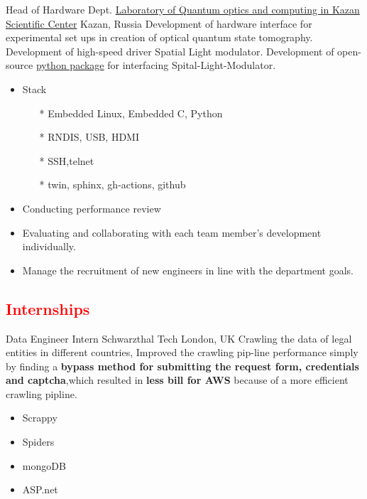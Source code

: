         {Head of Hardware Dept.}
        {\href{http://kfti.knc.ru/}{\color{blue}Laboratory of Quantum optics and  computing  in  Kazan Scientific Center}}
        {Kazan, Russia}
        {
        \newline
        Development of hardware interface for experimental set ups in creation of optical quantum state tomography. 
        Development of high-speed driver Spatial Light modulator.
        Development of open-source \href{https://pypi.org/project/holoeye-embedded/}{\color{blue}python package} for interfacing Spital-Light-Modulator.    
        } 
        {
        \begin{itemize}
            \item Stack
                \begin{itemize}
                \item[*] Embedded Linux, Embedded C, Python
                \item[*] RNDIS, USB, HDMI
                \item[*] SSH,telnet
                \item[*] twin, sphinx, gh-actions, github
                \end{itemize}
            \item Conducting performance review
            \item Evaluating and collaborating with each team member’s development individually.
            \item Manage the recruitment of new engineers in line with the department goals.
        \end{itemize}
        }

\newpage
\vspace{2mm}
\subsection{\Large{\textcolor{red}{Internships}}}


                {Data Engineer Intern}
                {Schwarzthal Tech}
                {London, UK}
                {
                \newline
                Crawling the data of legal entities in different countries, Improved the crawling pip-line performance simply by finding a  \textbf{bypass method for submitting the request form, credentials and captcha},which resulted in \textbf{less bill for AWS} because of a more efficient crawling pipline.  } 
                {
                \begin{itemize}
                    \item Scrappy
                    \item Spiders
                    \item mongoDB
                    \item ASP.net 
                \end{itemize}
                }
        
